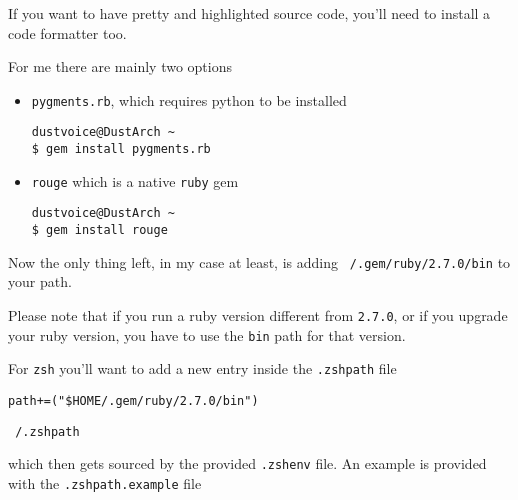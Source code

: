 \documentclass[10pt]{dustdoc}
\begin{document}
\begin{NOTE}
    If you want to have pretty and highlighted source code, you’ll need to install a code formatter too.

    For me there are mainly two options

    \begin{itemize}
        \item \texttt{pygments.rb}, which requires python to be installed

            \begin{verbatim}
dustvoice@DustArch ~
$ gem install pygments.rb
            \end{verbatim}

        \item \texttt{rouge} which is a native \texttt{ruby} gem

            \begin{verbatim}
dustvoice@DustArch ~
$ gem install rouge
            \end{verbatim}
    \end{itemize}
\end{NOTE}

Now the only thing left, in my case at least, is adding \texttt{~/.gem/ruby/2.7.0/bin} to your path.

\begin{NOTE}
    Please note that if you run a ruby version different from \texttt{2.7.0}, or if you upgrade your ruby version, you have to use the \texttt{bin} path for that version.
\end{NOTE}

For \texttt{zsh} you’ll want to add a new entry inside the \texttt{.zshpath} file

\begin{mintedlisting}
    \begin{verbatim}
path+=("$HOME/.gem/ruby/2.7.0/bin")
    \end{verbatim}

    \caption{\texttt{~/.zshpath}}
\end{mintedlisting}

\noindent
which then gets sourced by the provided \texttt{.zshenv} file.
An example is provided with the \texttt{.zshpath.example} file
\end{document}
